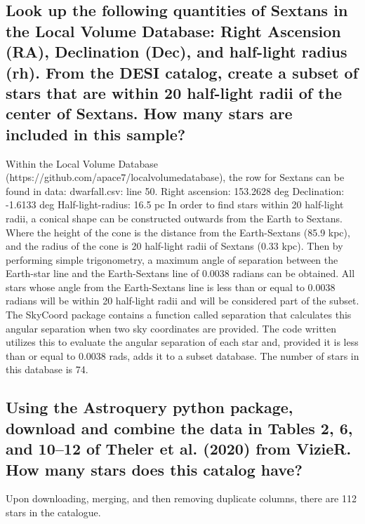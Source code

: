 \documentclass{article}
\begin{document}
\subsection{Look up the following quantities of Sextans in the Local Volume Database: Right Ascension (RA), Declination (Dec), and half-light radius (rh). From the DESI catalog, create a subset of stars that are within 20 half-light radii of the center of Sextans. How many stars are included in this sample?}
Within the Local Volume Database (https://github.com/apace7/local\textunderscore volume\textunderscore database), the row for Sextans can be found in data: dwarf\textunderscore all.csv: line 50.
\newline Right ascension: 153.2628 deg
\newline Declination: -1.6133 deg
\newline Half-light-radius: 16.5 pc
\newline In order to find stars within 20 half-light radii, a conical shape can be constructed outwards from the Earth to Sextans. Where the height of the cone is the distance from the Earth-Sextans (85.9 kpc), and the radius of the cone is 20 half-light radii of Sextans (0.33 kpc). Then by performing simple trigonometry, a maximum angle of separation between the Earth-star line and the Earth-Sextans line of 0.0038 radians can be obtained. All stars whose angle from the Earth-Sextans line is less than or equal to 0.0038 radians will be within 20 half-light radii and will be considered part of the subset. The SkyCoord package contains a function called separation that calculates this angular separation when two sky coordinates are provided. The code written utilizes this to evaluate the angular separation of each star and, provided it is less than or equal to 0.0038 rads, adds it to a subset database. The number of stars in this database is 74.

\subsection{Using the Astroquery python package, download and combine the data in Tables 2, 6, and 10–12 of Theler et al. (2020) from VizieR. How many stars does this catalog have?}
Upon downloading, merging, and then removing duplicate columns, there are 112 stars in the catalogue. 
\end{document}
